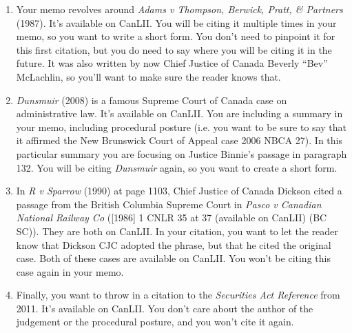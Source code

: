 \documentclass[11pt]{article}
\begin{document}
\begin{enumerate}
\item Your memo revolves around \emph{Adams v Thompson, Berwick, Pratt, \& Partners} (1987). It's available on CanLII. You will be citing it multiple times in your memo, so you want to write a short form. You don't need to pinpoint it for this first citation, but you do need to say where you will be citing it in the future. It was also written by now Chief Justice of Canada Beverly ``Bev'' McLachlin, so you'll want to make sure the reader knows that.
\item \emph{Dunsmuir} (2008) is a famous Supreme Court of Canada case on administrative law. It's available on CanLII. You are including a summary in your memo, including procedural posture (i.e. you want to be sure to say that it affirmed the New Brunswick Court of Appeal case 2006 NBCA 27). In this particular summary you are focusing on Justice Binnie's passage in paragraph 132. You will be citing \emph{Dunsmuir} again, so you want to create a short form.
\item In \emph{R v Sparrow} (1990) at page 1103, Chief Justice of Canada Dickson cited a passage from the British Columbia Supreme Court in \emph{Pasco v Canadian National Railway Co} ([1986] 1 CNLR 35 at 37 (available on CanLII) (BC SC)). They are both on CanLII. In your citation, you want to let the reader know that Dickson CJC adopted the phrase, but that he cited the original case. Both of these cases are available on CanLII. You won't be citing this case again in your memo.%
\item Finally, you want to throw in a citation to the \emph{Securities Act Reference} from 2011. It's available on CanLII. You don't care about the author of the judgement or the procedural posture, and you won't cite it again.
\end{enumerate}
\end{document}
